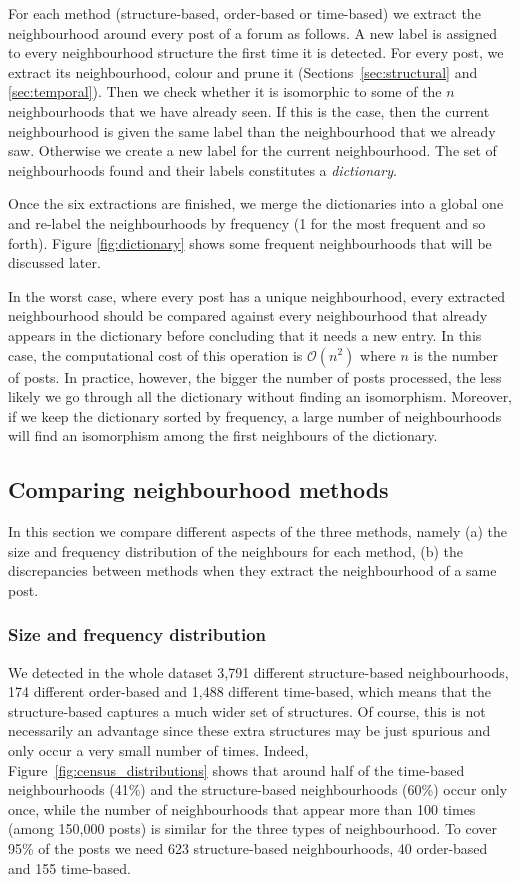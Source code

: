 \documentclass[conference]{IEEEtran}
\begin{document}
For each method (structure-based, order-based or time-based) we extract the neighbourhood around every post of a forum as follows. A new label is assigned to every neighbourhood structure the first time it is detected. For every post, we extract its neighbourhood, colour and prune it (Sections~\ref{sec:structural} and \ref{sec:temporal}). Then we check whether it is isomorphic to some of the $n$ neighbourhoods that we have already seen. If this is the case, then the current neighbourhood is given the same label than the neighbourhood that we already saw. Otherwise we create a new label for the current neighbourhood. The set of neighbourhoods found and their labels constitutes a \textit{dictionary}. 

Once the six extractions are finished, we merge the dictionaries into a global one and re-label the neighbourhoods by frequency (1 for the most frequent and so forth). Figure \ref{fig:dictionary} shows some frequent neighbourhoods that will be discussed later.

In the worst case, where every post has a unique neighbourhood, every extracted neighbourhood should be compared against every neighbourhood that already appears in the dictionary before concluding that it needs a new entry. In this case, the computational cost of this operation is $\mathcal{O}(n^2)$ where $n$ is the number of posts. In practice, however, the bigger the number of posts processed, the less likely we go through all the dictionary without finding an isomorphism. Moreover, if we keep the dictionary sorted by frequency, a large number of neighbourhoods will find an isomorphism among the first neighbours of the dictionary. 

\subsection{Comparing neighbourhood methods}
In this section we compare different aspects of the three methods, namely (a) the size and frequency distribution of the neighbours for each method, (b) the discrepancies between methods when they extract the neighbourhood of a same post.

\subsubsection{Size and frequency distribution}
We detected in the whole dataset 3,791 different structure-based neighbourhoods, 174 different order-based and 1,488 different time-based, which means that the structure-based captures a much wider set of structures. Of course, this is not necessarily an advantage since these extra structures may be just spurious and only occur a very small number of times. Indeed, Figure~\ref{fig:census_distributions} shows that around half of the time-based neighbourhoods (41\%) and the structure-based neighbourhoods (60\%) occur only once, while the number of neighbourhoods that appear more than 100 times (among 150,000 posts) is similar for the three types of neighbourhood. To cover 95\% of the posts we need 623 structure-based neighbourhoods, 40 order-based and 155 time-based. 
 
\end{document}
